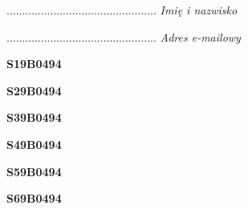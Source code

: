\begin{turn}{90}\begin{minipage}{\linewidth} \vspace{20mm} ................................................  \textit{Imię i nazwisko}\end{minipage}\end{turn}

\begin{turn}{90}\begin{minipage}{\linewidth} \vspace{20mm} ................................................  \textit{Adres e-mailowy}\end{minipage}\end{turn}

\begin{turn}{90}\huge \begin{minipage}{\linewidth} \vspace{10mm}\textbf{S19B0494}\end{minipage}\end{turn}

\begin{turn}{90}\huge \begin{minipage}{\linewidth} \vspace{10mm}\textbf{S29B0494}\end{minipage}\end{turn}

\begin{turn}{90}\huge \begin{minipage}{\linewidth} \vspace{10mm}\textbf{S39B0494}\end{minipage}\end{turn}

\begin{turn}{90}\huge \begin{minipage}{\linewidth} \vspace{10mm}\textbf{S49B0494}\end{minipage}\end{turn}

\begin{turn}{90}\huge \begin{minipage}{\linewidth} \vspace{10mm}\textbf{S59B0494}\end{minipage}\end{turn}

\begin{turn}{90}\huge \begin{minipage}{\linewidth} \vspace{10mm}\textbf{S69B0494}\end{minipage}\end{turn}

